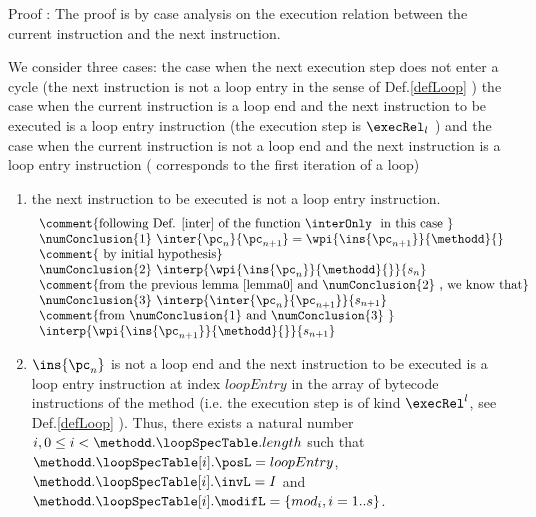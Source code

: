 Proof :
The proof is by case analysis on the execution relation \execRel{}  between the current instruction and the next instruction.

 We consider three cases: the case when the next execution step does not enter a cycle (the next instruction is not a loop entry in the sense of Def.\ref{defLoop} )
the case when the current instruction is a loop end and the next instruction to be executed is a loop entry instruction (the execution step is $\execRel_l$ )
and the case when the current instruction is not a loop end and the next instruction is a loop entry instruction ( corresponds to the first iteration of a loop) 

  
\begin{enumerate}
  \item the next instruction to be executed is not a loop entry instruction. 
           $$ \begin{array}{l}
	      \mbox{\rm \comment{following Def. \ref{inter} of the function \interOnly \ in this case }}\\
              \numConclusion{1} \ \inter{\pc_n}{\pc_{n+1}} = \wpi{ \ins{\pc_{n+1} }}{\methodd}{}\\
	      \mbox{\rm \comment{ by initial hypothesis}} \\
	      \numConclusion{2} \ \interp{\wpi{\ins{\pc_{n}} }{ \methodd }{} }{ s_n }\\
	      \mbox{\rm \comment{from the previous lemma \ref{lemma0} and \numConclusion{2} , we know that}}\\
	      \numConclusion{3} \   \interp{\inter{\pc_n}{\pc_{n+1}} }{ s_{n+1} }\\
	      \mbox{\rm \comment{from \numConclusion{1} and  \numConclusion{3} }}\\
	      \interp{ \wpi{\ins{\pc_{n+1}}}{\methodd}{} }{ s_{n+1} }
	      \end{array}$$

 
  
\item $\ins{\pc_n} $ is not a loop end and the next instruction to be executed is a loop entry 
instruction at index $loopEntry $ in the array of bytecode instructions of the method \methodd{}
 (i.e. the execution step is of kind $\execRel^l$, see Def.\ref{defLoop}  ).
 Thus, there exists a natural number  $ i , 0 \le i < \methodd.\loopSpecTable.length   $   such that
 $ \methodd. \loopSpecTable[i].\posL = loopEntry $,  $ \methodd. \loopSpecTable[i].\invL = I $ and
   $ \methodd. \loopSpecTable[i].\modifL =\{ mod_i, i = 1..s \}$.


\end{enumerate}
